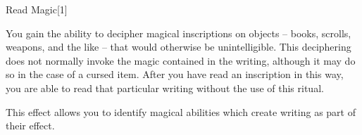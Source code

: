 \begin{spellsection}{Read Magic}[1]
    \begin{spellheader}
    \end{spellheader}
    \begin{spellcontent}
        \begin{spelltargetinginfo}
        \end{spelltargetinginfo}
        \begin{spelleffects}
            \spelleffect You gain the ability to decipher magical inscriptions on objects -- books, scrolls, weapons, and the like -- that would otherwise be unintelligible. This deciphering does not normally invoke the magic contained in the writing, although it may do so in the case of a cursed item. After you have read an inscription in this way, you are able to read that particular writing without the use of this ritual.

            This effect allows you to identify magical abilities which create writing as part of their effect.
            \spelldur \durlong
        \end{spelleffects}
    \end{spellcontent}
    \begin{spellfooter}
    \end{spellfooter}
    \begin{spellaugments}
    \end{spellaugments}
\end{spellsection}

